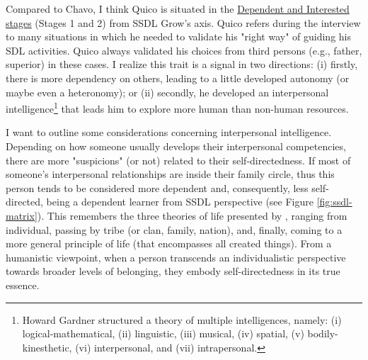 Compared to Chavo, I think Quico is situated in the \underline{Dependent and Interested stages} (Stages 1 and 2) from \gls{SSDL} Grow's axis. Quico refers during the interview to many situations in which he needed to validate his "right way" of guiding his \gls{SDL} activities. Quico always validated his choices from third persons (e.g., father, superior) in these cases. I realize this trait is a signal in two directions: (i) firstly, there is more dependency on others, leading to a little developed autonomy (or maybe even a heteronomy); or (ii) secondly, he developed an interpersonal intelligence\footnote{Howard Gardner \cite[p.~4]{gardner:1989} structured a theory of multiple intelligences, namely: (i) logical-mathematical, (ii) linguistic, (iii) musical, (iv) spatial, (v) bodily-kinesthetic, (vi) interpersonal, and (vii) intrapersonal.} that leads him to explore more human than non-human resources.

I want to outline some considerations concerning interpersonal intelligence. Depending on how someone usually develops their interpersonal competencies, there are more "suspicions" (or not) related to their self-directedness. If most of someone's interpersonal relationships are inside their family circle, thus this person tends to be considered more dependent and, consequently, less self-directed, being a dependent learner from \gls{SSDL} perspective (see Figure \ref{fig:ssdl-matrix}). This remembers the three theories of life presented by , ranging from individual, passing by tribe (or clan, family, nation), and, finally, coming to a more general principle of life (that encompasses all created things). From a humanistic viewpoint, when a person transcends an individualistic perspective towards broader levels of belonging, they embody self-directedness in its true essence.